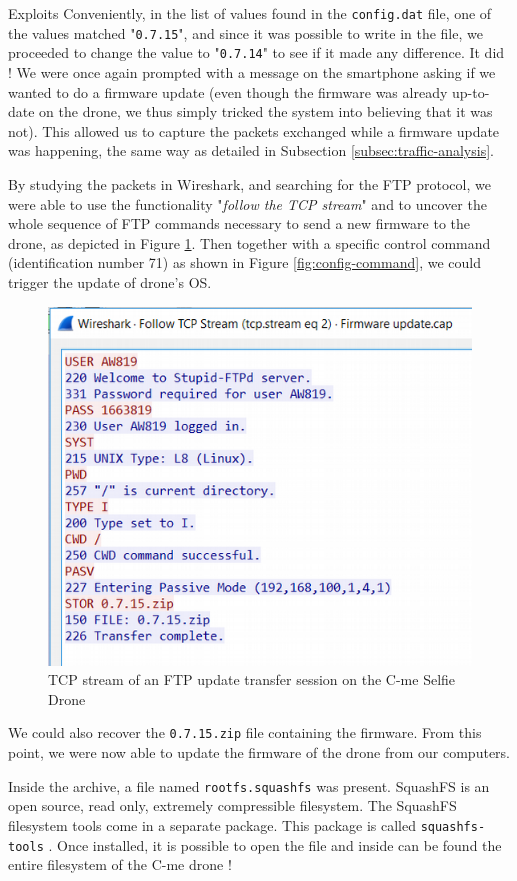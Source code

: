 \begin{chaptercover}{Exploits}
Conveniently, in the list of values found in the \texttt{config.dat} file, one of the values matched "\texttt{0.7.15}", and since it was possible to write in the file, we proceeded to change the value to "\texttt{0.7.14}" to see if it made any difference. It did ! We were once again prompted with a message on the smartphone asking if we wanted to do a firmware update (even though the firmware was already up-to-date on the drone, we thus simply tricked the system into believing that it was not). This allowed us to capture the packets exchanged while a firmware update was happening, the same way as detailed in Subsection \ref{subsec:traffic-analysis}.

By studying the packets in Wireshark, and searching for the FTP protocol, we were able to use the functionality "\textit{follow the TCP stream}" and to uncover the whole sequence of FTP commands necessary to send a new firmware to the drone, as depicted in Figure \ref{fig:ftp-tcp-stream}. Then together with a specific control command (identification number 71) as shown in Figure \ref{fig:config-command}, we could trigger the update of drone's OS.

\begin{figure}[H]
  \centering
  \includegraphics[width=.6\linewidth]{figures/ftp-tcp-stream}
  \caption{TCP stream of an FTP update transfer session on the C-me Selfie Drone}
  \label{fig:ftp-tcp-stream}
\end{figure}

We could also recover the \texttt{0.7.15.zip} file containing the firmware. From this point, we were now able to update the firmware of the drone from our computers.

Inside the archive, a file named \texttt{rootfs.squashfs} was present. SquashFS \cite{squashfs} is an open source, read only, extremely compressible filesystem. The SquashFS filesystem tools come in a separate package. This package is called \texttt{squashfs-tools} \cite{squashfs-tools}. Once installed, it is possible to open the file and inside can be found the entire filesystem of the C-me drone !


\end{chaptercover}
